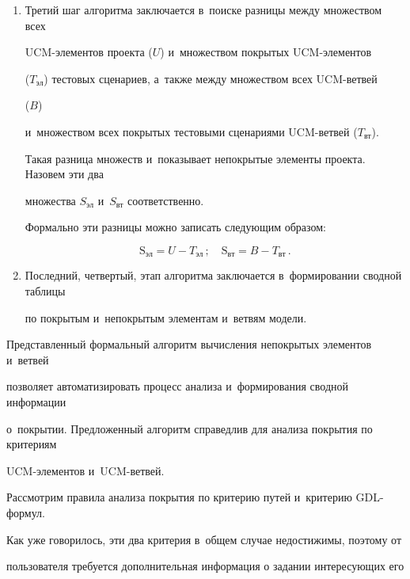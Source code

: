 \begin{enumerate}[1.]
UCM-вет\-вей проекта, сформированных на этапе~1.





 \item Третий шаг алгоритма заключается в~поиске разницы между множеством всех

  UCM-эле\-мен\-тов проекта ($U$) и~множеством покрытых UCM-эле\-мен\-тов

($T_{\mathrm{эл}}$) тестовых сценариев, а~также между множеством всех UCM-вет\-вей

($B$)

и~множеством всех покрытых тестовыми сценариями UCM-вет\-вей ($T_{\mathrm{вт}}$).

Такая разница множеств и~показывает непокрытые элементы проекта. Назовем эти два

множества $S_{\mathrm{эл}}$ и~$S_{\mathrm{вт}}$ соответственно.



  Формально эти разницы можно записать следующим образом:

  $$

  \mathrm{S}_{\mathrm{эл}} = U-T_{\mathrm{эл}}\,;\quad

\mathrm{S}_{\mathrm{вт}} = B-T_{\mathrm{вт}}\,.

  $$



\item  Последний, четвертый, этап алгоритма заключается в~формировании сводной таблицы

по покрытым и~непокрытым элементам и~ветвям модели.

\end{enumerate}



  Представленный формальный алгоритм вычисления непокрытых элементов и~ветвей

позволяет автоматизировать процесс анализа и~формирования сводной информации

о~покрытии. Предложенный алгоритм справедлив для анализа покрытия по критериям

UCM-эле\-мен\-тов и~UCM-вет\-вей.



  Рассмотрим правила анализа покрытия по критерию путей и~критерию GDL-фор\-мул.

Как уже говорилось, эти два критерия в~общем случае недостижимы, поэтому от

пользователя требуется дополнительная информация о задании интересующих его

